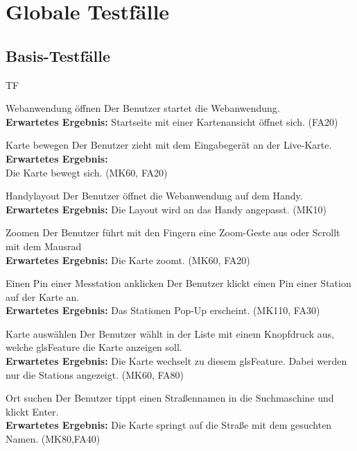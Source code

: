 \section{Globale Testfälle}
\setcounter{counter}{10}
\subsection{Basis-Testfälle}
\begin{Kriterien}{TF}

	
			\item[Webanwendung öffnen] Der Benutzer startet die \gls{Webanwendung}. \\ \textbf{Erwartetes Ergebnis:} Startseite mit einer Kartenansicht öffnet sich. (FA20)

	\item[Karte bewegen] Der Benutzer zieht mit dem Eingabegerät an der \gls{Live-Karte}. \textbf{Erwartetes Ergebnis:} \\ Die Karte bewegt sich.  (MK60, FA20)
    
    \item[Handylayout] Der Benutzer öffnet die Webanwendung auf dem Handy. \\ \textbf{Erwartetes Ergebnis:} Die Layout wird an das Handy angepasst. (MK10)
	
	\item[Zoomen] Der Benutzer führt mit den Fingern eine Zoom-Geste aus oder Scrollt mit dem Mausrad \\ \textbf{Erwartetes Ergebnis:} Die Karte zoomt. (MK60, FA20)
	
	\item[Einen Pin einer Messtation anklicken] Der Benutzer klickt einen Pin einer \gls{Station} auf der Karte an. \\ \textbf{Erwartetes Ergebnis:} Das Stationen Pop-Up erscheint. (MK110,  FA30)
	
	\item[Karte auswählen] Der Benutzer wählt in der Liste mit einem Knopfdruck aus, welche gls{Feature} die Karte anzeigen soll. \\ \textbf{Erwartetes Ergebnis:} Die Karte wechselt zu diesem gls{Feature}. Dabei werden nur die \glspl{Station} angezeigt. (MK60, FA80)
	
	\item[Ort suchen] Der Benutzer tippt einen Straßennamen in die Suchmaschine und klickt Enter. \\ \textbf{Erwartetes Ergebnis:} Die Karte springt auf die Straße mit dem gesuchten Namen. (MK80,FA40)
	

\end{Kriterien}

